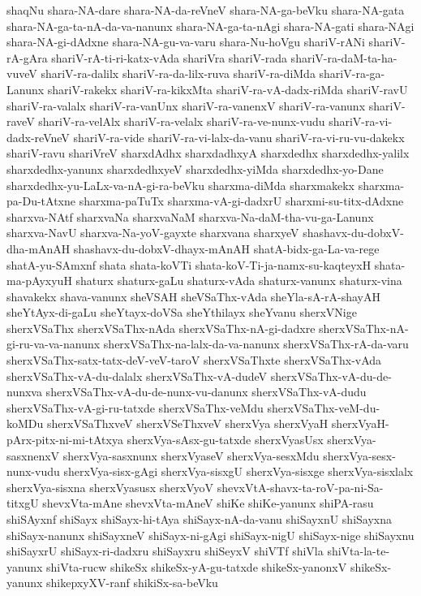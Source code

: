 {shaqNu
shara-NA-dare
shara-NA-da-reVneV
shara-NA-ga-beVku
shara-NA-gata
shara-NA-ga-ta-nA-da-va-nanunx
shara-NA-ga-ta-nAgi
shara-NA-gati
shara-NAgi
shara-NA-gi-dAdxne
shara-NA-gu-va-varu
shara-Nu-hoVgu
shariV-rANi
shariV-rA-gAra
shariV-rA-ti-ri-katx-vAda
shariVra
shariV-rada
shariV-ra-daM-ta-ha-vuveV
shariV-ra-dalilx
shariV-ra-da-lilx-ruva
shariV-ra-diMda
shariV-ra-ga-Lanunx
shariV-rakekx
shariV-ra-kikxMta
shariV-ra-vA-dadx-riMda
shariV-ravU
shariV-ra-valalx
shariV-ra-vanUnx
shariV-ra-vanenxV
shariV-ra-vanunx
shariV-raveV
shariV-ra-velAlx
shariV-ra-velalx
shariV-ra-ve-nunx-vudu
shariV-ra-vi-dadx-reVneV
shariV-ra-vide
shariV-ra-vi-lalx-da-vanu
shariV-ra-vi-ru-vu-dakekx
shariV-ravu
shariVreV
sharxdAdhx
sharxdadhxyA
sharxdedhx
sharxdedhx-yalilx
sharxdedhx-yanunx
sharxdedhxyeV
sharxdedhx-yiMda
sharxdedhx-yo-Dane
sharxdedhx-yu-LaLx-va-nA-gi-ra-beVku
sharxma-diMda
sharxmakekx
sharxma-pa-Du-tAtxne
sharxma-paTuTx
sharxma-vA-gi-dadxrU
sharxmi-su-titx-dAdxne
sharxva-NAtf
sharxvaNa
sharxvaNaM
sharxva-Na-daM-tha-vu-ga-Lanunx
sharxva-NavU
sharxva-Na-yoV-gayxte
sharxvana
sharxyeV
shashavx-du-dobxV-dha-mAnAH
shashavx-du-dobxV-dhayx-mAnAH
shatA-bidx-ga-La-va-rege
shatA-yu-SAmxnf
shata
shata-koVTi
shata-koV-Ti-ja-namx-su-kaqteyxH
shata-ma-pAyxyuH
shaturx
shaturx-gaLu
shaturx-vAda
shaturx-vanunx
shaturx-vina
shavakekx
shava-vanunx
sheVSAH
sheVSaThx-vAda
sheYla-sA-rA-shayAH
sheYtAyx-di-gaLu
sheYtayx-doVSa
sheYthilayx
sheYvanu
sherxVNige
sherxVSaThx
sherxVSaThx-nAda
sherxVSaThx-nA-gi-dadxre
sherxVSaThx-nA-gi-ru-va-va-nanunx
sherxVSaThx-na-lalx-da-va-nanunx
sherxVSaThx-rA-da-varu
sherxVSaThx-satx-tatx-deV-veV-taroV
sherxVSaThxte
sherxVSaThx-vAda
sherxVSaThx-vA-du-dalalx
sherxVSaThx-vA-dudeV
sherxVSaThx-vA-du-de-nunxva
sherxVSaThx-vA-du-de-nunx-vu-danunx
sherxVSaThx-vA-dudu
sherxVSaThx-vA-gi-ru-tatxde
sherxVSaThx-veMdu
sherxVSaThx-veM-du-koMDu
sherxVSaThxveV
sherxVSeThxveV
sherxVya
sherxVyaH
sherxVyaH-pArx-pitx-ni-mi-tAtxya
sherxVya-sAsx-gu-tatxde
sherxVyasUsx
sherxVya-sasxnenxV
sherxVya-sasxnunx
sherxVyaseV
sherxVya-sesxMdu
sherxVya-sesx-nunx-vudu
sherxVya-sisx-gAgi
sherxVya-sisxgU
sherxVya-sisxge
sherxVya-sisxlalx
sherxVya-sisxna
sherxVyasusx
sherxVyoV
shevxVtA-shavx-ta-roV-pa-ni-Sa-titxgU
shevxVta-mAne
shevxVta-mAneV
shiKe
shiKe-yanunx
shiPA-rasu
shiSAyxnf
shiSayx
shiSayx-hi-tAya
shiSayx-nA-da-vanu
shiSayxnU
shiSayxna
shiSayx-nanunx
shiSayxneV
shiSayx-ni-gAgi
shiSayx-nigU
shiSayx-nige
shiSayxnu
shiSayxrU
shiSayx-ri-dadxru
shiSayxru
shiSeyxV
shiVTf
shiVla
shiVta-la-te-yanunx
shiVta-rucw
shikeSx
shikeSx-yA-gu-tatxde
shikeSx-yanonxV
shikeSx-yanunx
shikepxyXV-ranf
shikiSx-sa-beVku
}
